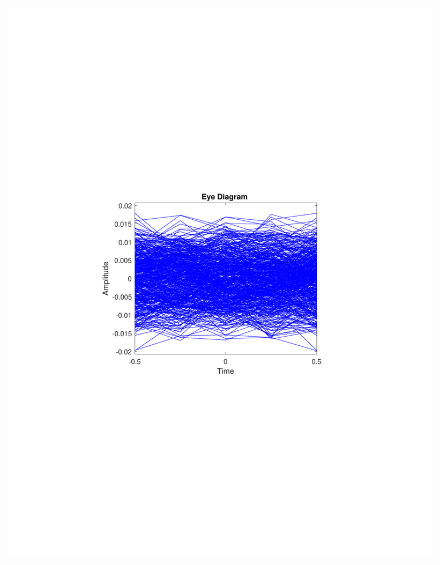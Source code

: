 \begin{refsection}
\begin{figure}[H]
\begin{minipage}{0.30\textwidth}
		\includegraphics[clip, trim=4cm 8cm 4cm 8cm, width=1\textwidth]{./sdf/m_qam_system/figures/expResults/intradyne/0_eye_16GBdInSig13dB_bfFec.pdf}
		\label{fig:16GBdSpecBefFec}
	\end{minipage}
	\begin{minipage}{0.30\textwidth}
		\centering

\end{minipage}
\end{figure}
\end{refsection}
